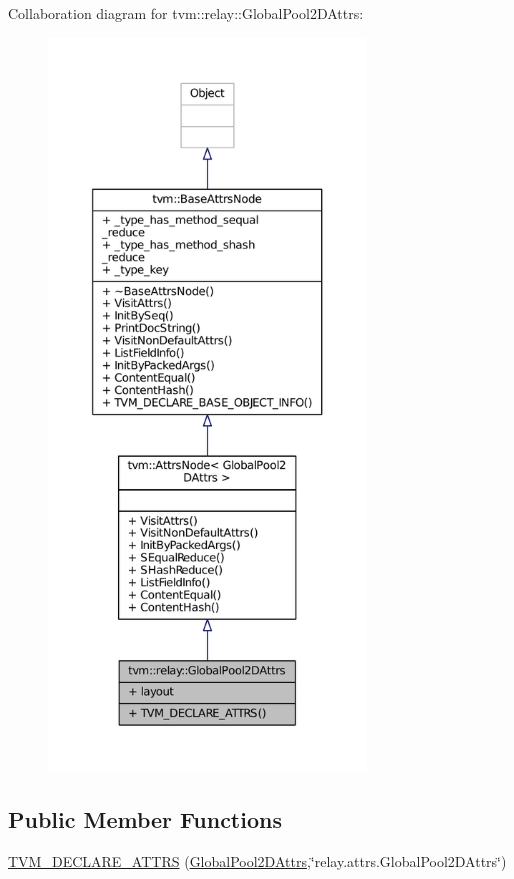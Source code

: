 Collaboration diagram for tvm\+:\+:relay\+:\+:Global\+Pool2\+D\+Attrs\+:
\nopagebreak
\begin{figure}[H]
\begin{center}
\leavevmode
\includegraphics[height=550pt]{structtvm_1_1relay_1_1GlobalPool2DAttrs__coll__graph}
\end{center}
\end{figure}
\subsection*{Public Member Functions}
\begin{DoxyCompactItemize}
\item 
\hyperlink{structtvm_1_1relay_1_1GlobalPool2DAttrs_aaae394b14069baaf0fc368ff7dd478ad}{T\+V\+M\+\_\+\+D\+E\+C\+L\+A\+R\+E\+\_\+\+A\+T\+T\+RS} (\hyperlink{structtvm_1_1relay_1_1GlobalPool2DAttrs}{Global\+Pool2\+D\+Attrs},\char`\"{}relay.\+attrs.\+Global\+Pool2\+D\+Attrs\char`\"{})
\end{DoxyCompactItemize}
